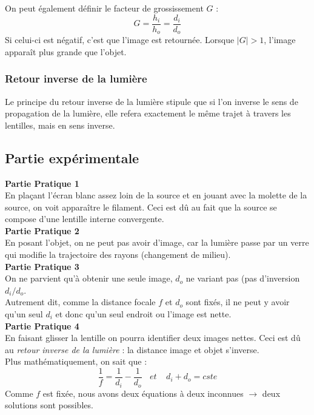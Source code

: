 \documentclass	[11pt, a4paper, openany]{book}
\begin{document}
		On peut également définir le facteur de grossissement $G$ :
		\begin{equation}
			G = \frac{h_i}{h_o} = \frac{d_i}{d_o}
		\end{equation}
		Si celui-ci est négatif, c'est que l'image est retournée. Lorsque $|G| > 1$, l'image apparaît plus grande que l'objet.
		
		\subsubsection*{Retour inverse de la lumière}
		Le principe du retour inverse de la lumière stipule que si l'on inverse le sens de propagation de la lumière, elle refera exactement le même trajet à travers les lentilles, mais en sens inverse.
		
		\newpage
		\subsection{Partie expérimentale}
		\textbf{Partie Pratique 1}\\
		En plaçant l'écran blanc assez loin de la source et en jouant avec la molette de la source, on voit apparaître le filament. Ceci est dû au fait que la source se compose d'une lentille interne convergente.\\
		
		\textbf{Partie Pratique 2}\\
		En posant l'objet, on ne peut pas avoir d'image, car la lumière passe par un verre qui modifie la trajectoire des rayons (changement de milieu).\\
		
		\textbf{Partie Pratique 3}\\
		On ne parvient qu'à obtenir une seule image, $d_o$ ne variant pas (pas d'inversion $d_i/d_o$.\\
		Autrement dit, comme la distance focale $f$ et $d_o$ sont fixés, il ne peut y avoir qu'un seul $d_i$ et donc qu'un seul endroit ou l'image est nette.\\
		
		\textbf{Partie Pratique 4}\\
		En faisant glisser la lentille on pourra identifier deux images nettes. Ceci est dû au \textit{retour inverse de la lumière} : la distance image et objet s'inverse.\\
		Plus mathématiquement, on sait que :
		\begin{equation}
			\frac{1}{f} = \frac{1}{d_i} - \frac{1}{d_o}\ \ \ \ et\ \ \ \ \ d_i + d_o = cste
		\end{equation}
		Comme $f$ est fixée, nous avons deux équations à deux inconnues $\rightarrow$ deux solutions sont possibles.\\
		
\end{document}
